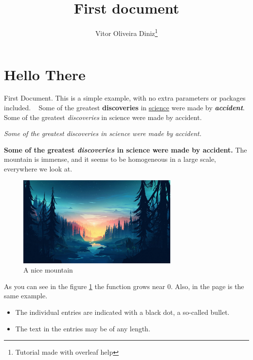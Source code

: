 \documentclass[12pt, letterpaper]{report}
\title{First document}
\author{Vitor Oliveira Diniz\thanks{Tutorial made with overleaf help}}
\date{ }
\begin{document}
    \maketitle
    \tableofcontents

    \section*{Hello There
    }
    First Document. This is a simple example, with no extra parameters or packages included.
    \bigbreak
    \
    Some of the greatest \textbf{discoveries} in \underline{science} were made by \textbf{\textit{accident}}.
    \bigbreak
    Some of the greatest \emph{discoveries} in science were made by accident.
    \bigbreak
    
    \textit{Some of the greatest \emph{discoveries} in science were made by accident.}

    \bigbreak
    \textbf{Some of the greatest \emph{discoveries} in science were made by accident.}
    \bigbreak
    The mountain is immense, and it seems to be homogeneous in a large scale, everywhere we look at.
    \bigbreak


    \pagebreak
    \begin{figure}[h]
        \includegraphics[width=80mm]{mountains_wallpaper.png}
        \centering
        \caption{A nice mountain}
        \label{fig:mount1}
    \end{figure}

    As you can see in the figure \ref{fig:mount1} the function grows near 0. Also, in the page \pageref{fig:mount1} is the same example.

    \pagebreak

    \begin{itemize}
        \item The individual entries are indicated with a black dot, a so-called bullet.
        \item The text in the entries may be of any length.
    \end{itemize}
\end{document}

